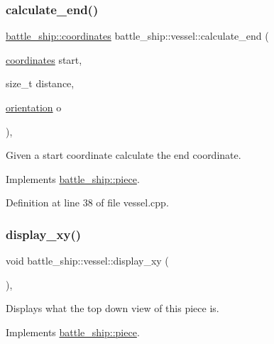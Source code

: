 \subsubsection{\texorpdfstring{calculate\+\_\+end()}{calculate\_end()}}
{\footnotesize\ttfamily \hyperlink{structbattle__ship_1_1coordinates}{battle\+\_\+ship\+::coordinates} battle\+\_\+ship\+::vessel\+::calculate\+\_\+end (\begin{DoxyParamCaption}\item[{\hyperlink{structbattle__ship_1_1coordinates}{coordinates}}]{start,  }\item[{size\+\_\+t}]{distance,  }\item[{\hyperlink{namespacebattle__ship_aed87488f0a73f0d0679fe343fb61c784}{orientation}}]{o }\end{DoxyParamCaption})\hspace{0.3cm}{\ttfamily [override]}, {\ttfamily [virtual]}}



Given a start coordinate calculate the end coordinate. 



Implements \hyperlink{classbattle__ship_1_1piece_a58092f7b1d663471204d7e51e68bbb2d}{battle\+\_\+ship\+::piece}.



Definition at line 38 of file vessel.\+cpp.

\mbox{\label{classbattle__ship_1_1vessel_a60924b058d686ebf545ae8f4d9f42d76}} 
\subsubsection{\texorpdfstring{display\+\_\+xy()}{display\_xy()}}
{\footnotesize\ttfamily void battle\+\_\+ship\+::vessel\+::display\+\_\+xy (\begin{DoxyParamCaption}{ }\end{DoxyParamCaption})\hspace{0.3cm}{\ttfamily [override]}, {\ttfamily [virtual]}}



Displays what the top down view of this piece is. 



Implements \hyperlink{classbattle__ship_1_1piece_a0f900b13641277ae9e809e4baa5c8c10}{battle\+\_\+ship\+::piece}.



